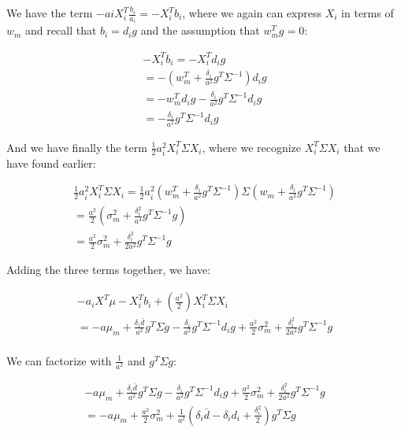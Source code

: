 We have the term $-ai X_i^T \frac{b_i}{a_i} = -X_i^T b_i$, where we 
again can express $X_i$ in terms of $w_m$ and recall that $b_i = d_i g$ and 
the assumption that $w_m^T g = 0$:

\begin{equation}
    \begin{aligned}
    -X_i^T b_i = -X_i^T d_i g \\
    = - (w_m^T + \frac{\delta_i}{a^2} g^T \Sigma^{-1}) d_i g \\
    = -w_m^T d_i g - \frac{\delta_i}{a^2} g^T \Sigma^{-1} d_i g \\
    = - \frac{\delta_i}{a^2} g^T \Sigma^{-1} d_i g
    \end{aligned}
\end{equation}

And we have finally the term $\frac{1}{2}a_i^2 X_i^T \Sigma X_i$,
where we recognize $X_i^T \Sigma X_i$ that we have found earlier:

\begin{equation}
    \begin{aligned}
    \frac{1}{2}a_i^2 X_i^T \Sigma X_i = \frac{1}{2}a_i^2 (w_m^T + \frac{\delta_i}{a^2} g^T \Sigma^{-1}) \Sigma (w_m + \frac{\delta_i}{a^2} g^T \Sigma^{-1}) \\
        = \frac{a^2}{2}(\sigma^2_m + \frac{\delta_i^2}{a^4} g^T \Sigma^{-1} g) \\
        = \frac{a^2}{2} \sigma^2_m + \frac{\delta_i^2}{2a^2} g^T \Sigma^{-1} g
    \end{aligned}
\end{equation}

Adding the three terms together, we have:

\begin{equation}
    \begin{aligned}
        -a_i X^T \mu - X_i^T b_i + (\frac{a^2}{2})X_i^T \Sigma X_i \\
        = -a \mu_m + \frac{\delta_i \bar{d}}{a^2} g^T \Sigma g -  \frac{\delta_i}{a^2} g^T \Sigma^{-1} d_i g + \frac{a^2}{2} \sigma^2_m + \frac{\delta_i^2}{2a^2} g^T \Sigma^{-1} g \\
    \end{aligned}
\end{equation}

We can factorize with $\frac{1}{a^2}$ and $g^T \Sigma g$:

\begin{equation}
    \begin{aligned}
        -a \mu_m + \frac{\delta_i \bar{d}}{a^2} g^T \Sigma g -  \frac{\delta_i}{a^2} g^T \Sigma^{-1} d_i g + \frac{a^2}{2} \sigma^2_m + \frac{\delta_i^2}{2a^2} g^T \Sigma^{-1} g \\
        = -a \mu_m + \frac{a^2}{2} \sigma^2_m + \frac{1}{a^2} ( \delta_i \bar{d} - \delta_i d_i + \frac{\delta_i^2}{2}) g^T \Sigma g\\
    \end{aligned}
\end{equation}

